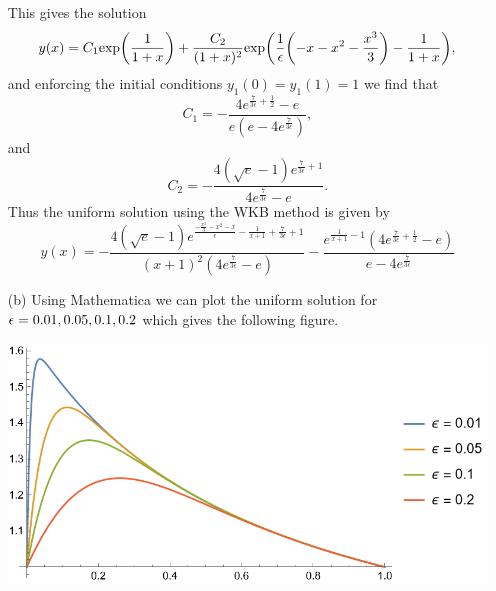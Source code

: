 \documentclass[12pt]{report}
\begin{document}
\begin{solution}
\begin{enumerate}
        This gives the solution
        \[ 
            y(x) = C_1 \text{exp}{\left(\frac{1}{1 + x}\right)} + \frac{C_2}{(1+x)^2}\text{exp}{\left(\frac{1}{{\epsilon}}{\left(-x - x^2 - \frac{x^3}{3}\right)} -\frac{1}{1+x}\right)},
        \]
        and enforcing the initial conditions $y_1(0) = y_1(1) = 1$ we find that
        \[ 
            C_1 = -\frac{4 e^{\frac{7}{3 \epsilon }+\frac{1}{2}}-e}{e \left(e-4 e^{\frac{7}{3 \epsilon }}\right)},
        \]
        and
        \[ 
            C_2 = -\frac{4 \left(\sqrt{e}-1\right) e^{\frac{7}{3 \epsilon }+1}}{4 e^{\frac{7}{3 \epsilon }}-e}.
        \]
        Thus the uniform solution using the WKB method is given by
        \[ 
            y(x) = -\frac{4 \left(\sqrt{e}-1\right) e^{\frac{-\frac{x^3}{3}-x^2-x}{\epsilon }-\frac{1}{x+1}+\frac{7}{3 \epsilon }+1}}{(x+1)^2 \left(4 e^{\frac{7}{3 \epsilon }}-e\right)}-\frac{e^{\frac{1}{x+1}-1} \left(4 e^{\frac{7}{3 \epsilon }+\frac{1}{2}}-e\right)}{e-4 e^{\frac{7}{3 \epsilon }}}
        \]

        \item [(b)]
        Using Mathematica we can plot the uniform solution for ${\epsilon} = 0.01,0.05,0.1,0.2$ which gives the following figure.
        \begin{center}
            \includegraphics[width=.8\textwidth]{1.png}
        \end{center}
        
        
    \end{enumerate}
\end{solution}

\newpage
\end{document}

